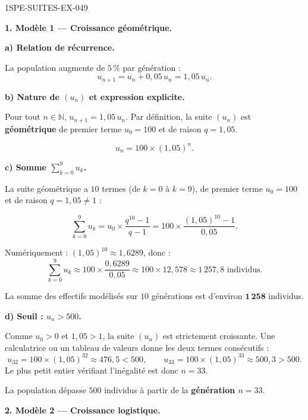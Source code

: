 \begin{corrige}{1SPE-SUITES-EX-049}

\textbf{1. Modèle 1 — Croissance géométrique.}

\textbf{a) Relation de récurrence.}

La population augmente de $5\,\%$ par génération :
\[
u_{n+1} = u_n + 0{,}05\,u_n = 1{,}05\,u_n.
\]


\textbf{b) Nature de $(u_n)$ et expression explicite.}

Pour tout $n \in \mathbb{N}$, $u_{n+1}=1{,}05\,u_n$. Par définition, la suite $(u_n)$ est \textbf{géométrique} de premier terme $u_0 = 100$ et de raison $q = 1{,}05$.

\[
\boxed{u_n = 100 \times (1{,}05)^n.}
\]

\textbf{c) Somme $\displaystyle\sum_{k=0}^{9} u_k$.}

La suite géométrique a $10$ termes (de $k = 0$ à $k = 9$), de premier terme $u_0 = 100$ et de raison $q = 1{,}05
\neq 1$ :

\[
\sum_{k=0}^{9} u_k = u_0 \times \frac{q^{10} - 1}{q - 1} = 100 \times \frac{(1{,}05)^{10} - 1}{0{,}05}.
\]

Numériquement : $(1{,}05)^{10} \approx 1{,}6289$, donc :
\[
\sum_{k=0}^{9} u_k \approx 100 \times \frac{0{,}6289}{0{,}05} \approx 100 \times 12{,}578 \approx 1\,257{,}8 \text{ individus.}
\]

La somme des effectifs modélisés sur $10$ générations est d'environ $\mathbf{1\,258}$ individus.

\textbf{d) Seuil : $u_n > 500$.}

Comme $u_0>0$ et $1{,}05>1$, la suite $(u_n)$ est strictement croissante. Une calculatrice ou un tableau de valeurs donne les deux termes consécutifs :
\[
u_{32}=100\times(1{,}05)^{32}\approx 476{,}5<500,
\qquad
u_{33}=100\times(1{,}05)^{33}\approx 500{,}3>500.
\]
Le plus petit entier vérifiant l'inégalité est donc $n=33$.

La population dépasse $500$ individus à partir de la \textbf{génération $n = 33$}.

\textbf{2. Modèle 2 — Croissance logistique.}


\end{corrige}
